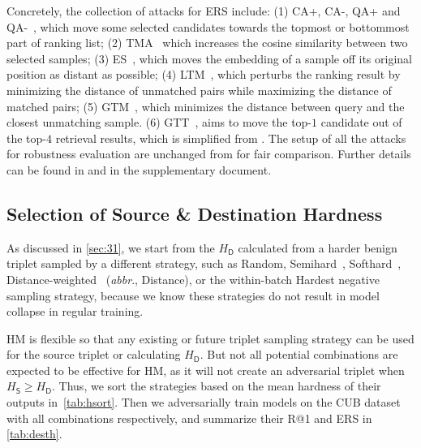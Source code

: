 \documentclass[10pt,twocolumn,letterpaper]{article}
\begin{document}
Concretely, the collection of attacks for ERS include:
%
(1) CA+, CA-, QA+ and QA-~\cite{advrank}, which move some selected candidates
towards the topmost or bottommost part of ranking list;
%
(2) TMA~\cite{flowertower} which increases the cosine similarity between two selected samples;
%
(3) ES~\cite{advrank,advdpqn}, which moves the embedding of a sample off its original position as
distant as possible;
%
(4) LTM~\cite{learn-to-misrank}, which perturbs the ranking result by minimizing the distance of
unmatched pairs while maximizing the distance of matched pairs;
%
(5) GTM~\cite{robrank}, which minimizes the distance between query and the
closest unmatching sample.
%
(6) GTT~\cite{robrank}, aims to move the top-$1$ candidate out of the top-$4$
retrieval results, which is simplified from \cite{qair}.
%
The setup of all the attacks for robustness evaluation are unchanged from
\cite{robrank} for fair comparison.
%
Further details can be found in \cite{robrank} and in the supplementary document.

\subsection{Selection of Source \& Destination Hardness}
\label{sec:41}






As discussed in \cref{sec:31}, we start from the $H_\mathsf{D}$ calculated from
a harder benign triplet sampled by a different strategy, such as Random,
Semihard~\cite{facenet}, Softhard~\cite{revisiting},
Distance-weighted~\cite{distance} (\emph{abbr}., Distance), or the within-batch
Hardest negative sampling strategy, because we know these strategies do not
result in model collapse in regular training.


HM is flexible so that any existing or future triplet sampling strategy
can be used for the source triplet or calculating $H_\mathsf{D}$.
%
But not all potential combinations are expected to be effective for HM, as it
will not create an adversarial triplet when $H_\mathsf{S}\geqslant
H_\mathsf{D}$.
%
Thus, we sort the strategies based on the mean hardness of their
outputs in~\cref{tab:hsort}.
%
Then we adversarially train models on the CUB dataset with all combinations
respectively, and summarize their R@1 and ERS in \cref{tab:desth}.


\end{document}
